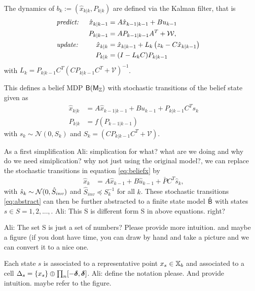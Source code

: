 \documentclass{ifacconf}
\renewcommand{\axx}[1]{{\color{orange} Ali: #1}}
\begin{document}
The dynamics of  $b_k:=(\hat x_{k|k}, P_{k|k})$ are defined via the 
 Kalman filter, that is
	\begin{align*}
	&\text{\it predict: }&\hat x_{k|k-1}&=A\hat x_{k-1|k-1}+Bu_{k-1} \\
	&&P_{k|k-1}&=AP_{k-1|k-1}A^T+\mathcal W,
\\
	&\text{\it update: }&\hat x_{k|k}&=\hat x_{k|k-1}+L_k\left(z_k-C \hat x_{k|k-1}\right)\\
	&&P_{k|k}&=(I-L_kC)P_{k|k-1}
	\end{align*}
	with  $L_{k}=P_{k|k-1}C^T\left(CP_{k|k-1}C^T+\mathcal V\right)^{-1}$.
 
This defines a belief MDP $\mathsf{B}{(\mathsf{M}_{{\mathbb{Z}}})}$ with stochastic transitions of the belief state given as 
\begin{align}
	&&\hat x_{k|k}&=A\hat x_{k-1|k-1}+Bu_{k-1}+P_{k|k-1}C^Ts_k\label{eq:beliefx}\\
	&&P_{k|k}&=f(P_{k-1|k-1})
\end{align}
with $s_k\sim \mathcal N (0, S_k )$ and  $S_k=\left(CP_{k|k-1}C^T+\mathcal V\right)$. 

 
As a first simplification \axx{simplication for what? what are we doing and why do we need simiplication? why not just using the original model?}, we can replace the stochastic transitions  in equation \eqref{eq:beliefx} by
\begin{align}  
		&&\hat x_k &=A\hat x_{k-1} +B\hat u_{k-1} + \bar P  C^T  \hat{s}_k,\label{eq:abstract} 
\end{align}
with $ \hat{s}_k\sim \mathcal{N} (0,\hat{S}_{inv})$ and $\hat{S}_{inv}\preceq S_k^{-1}$ for all $k$.
These stochastic transitions \eqref{eq:abstract} can then be further abstracted to a finite state model $\hat{\mathsf{B}}$ with states $s\in S=1,2,..., $.
\axx{This S is different form S in above equations. right?}

\axx{The set S is just a set of numbers? Please provide more intuition. and maybe a figure (if you dont have time, you can draw by hand and take a picture and we can convert it to a nice one.}

Each state $s$ is associated to a representative point $x_s\in {{\mathbb{X}}_b}$ and associated to a 
cell $\Delta_s=\{x_s\} \oplus \prod_n [-\boldsymbol{\delta}, \boldsymbol{\delta}]$.
\axx{define the notation please. And provide intuition. maybe refer to the figure.}
\end{document}
